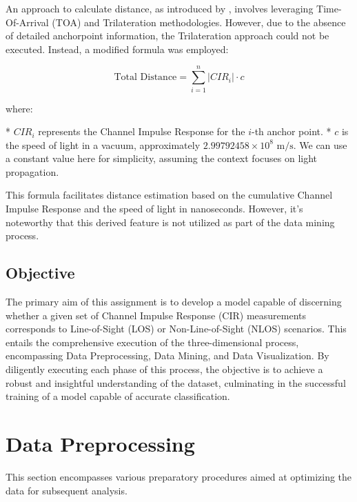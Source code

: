 \documentclass[
	a4paper, %
	11pt, %
]{CSUniSchoolLabReport}
\begin{document}
An approach to calculate distance, as introduced by \cite{9870651}, involves leveraging Time-Of-Arrival (TOA) and Trilateration methodologies. However, due to the absence of detailed anchorpoint information, the Trilateration approach could not be executed. Instead, a modified formula was employed:

\begin{equation}
\text{Total Distance} = \sum_{i=1}^{n} |CIR_i| \cdot c
\end{equation}

where:

* $CIR_i$ represents the Channel Impulse Response for the $i$-th anchor point.
* $c$ is the speed of light in a vacuum, approximately $2.99792458 \times 10^8 \text{ m/s}$. We can use a constant value here for simplicity, assuming the context focuses on light propagation.


This formula facilitates distance estimation based on the cumulative Channel Impulse Response and the speed of light in nanoseconds. However, it's noteworthy that this derived feature is not utilized as part of the data mining process.



\subsection{Objective}\label{objective}

The primary aim of this assignment is to develop a model capable of discerning whether a given set of Channel Impulse Response (CIR) measurements corresponds to Line-of-Sight (LOS) or Non-Line-of-Sight (NLOS) scenarios. This entails the comprehensive execution of the three-dimensional process, encompassing Data Preprocessing, Data Mining, and Data Visualization. By diligently executing each phase of this process, the objective is to achieve a robust and insightful understanding of the dataset, culminating in the successful training of a model capable of accurate classification.


\section{Data Preprocessing}\label{data_preprocessing}

This section encompasses various preparatory procedures aimed at optimizing the data for subsequent analysis.
\end{document}
